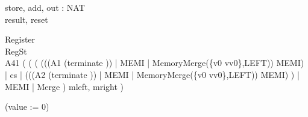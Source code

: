 \documentclass{llncs}
\begin{document}
\begin{circus}
\circchannel store, add, out : NAT\\
\circchannel result, reset\\
\end{circus}
\begin{circus}
\circprocess Register \circdef\\
\circbegin \circstate RegSt \\
A41 \circdef(
				(
					(
						(((A1 \circseq (terminate \then \Skip)) \lpar {} | MEMI | {} \rpar MemoryMerge(\{v0 \mapsto vv0\},LEFT)) \circhide MEMI)
						\lpar {} | cs | {} \rpar
						(((A2 \circseq (terminate \then \Skip)) \lpar {} | MEMI | {} \rpar MemoryMerge(\{v0 \mapsto vv0\},LEFT)) \circhide MEMI)
					)
					\lpar {} | MEMI | {} \rpar
					Merge
			) \circhide \lchanset mleft, mright \rchanset)

\circspot (value := 0) \\
\circend\\
\end{circus}
\end{document}
